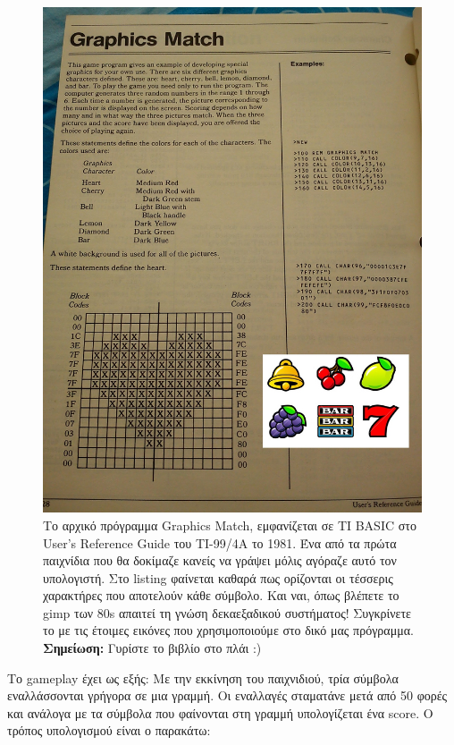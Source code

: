 \begin{figure}
  \centering
  \includegraphics[height=0.95\textheight, angle=90]{images/chapter6/usersguide}
  \caption[TI-BASIC και Graphics Match]{Το αρχικό πρόγραμμα Graphics Match, εμφανίζεται σε TI BASIC στο
User's Reference Guide του ΤΙ-99/4Α το 1981. Ένα από τα πρώτα παιχνίδια που
θα δοκίμαζε κανείς να γράψει μόλις αγόραζε αυτό τον υπολογιστή. Στο listing
φαίνεται καθαρά πως ορίζονται οι τέσσερις χαρακτήρες που αποτελούν κάθε
σύμβολο. Και ναι, όπως βλέπετε το gimp των 80s απαιτεί τη γνώση δεκαεξαδικού
συστήματος! Συγκρίνετε το με τις έτοιμες εικόνες που χρησιμοποιούμε στο δικό
μας πρόγραμμα. {\bf Σημείωση:} Γυρίστε το βιβλίο στο πλάι :)}
  \label{6-2}
\end{figure}

Το gameplay έχει ως εξής: Με την εκκίνηση του παιχνιδιού, τρία σύμβολα  εναλλάσσονται γρήγορα σε μια γραμμή. Οι εναλλαγές σταματάνε μετά από 50 φορές και ανάλογα με τα σύμβολα που φαίνονται στη γραμμή υπολογίζεται ένα score. Ο τρόπος υπολογισμού είναι ο παρακάτω:

